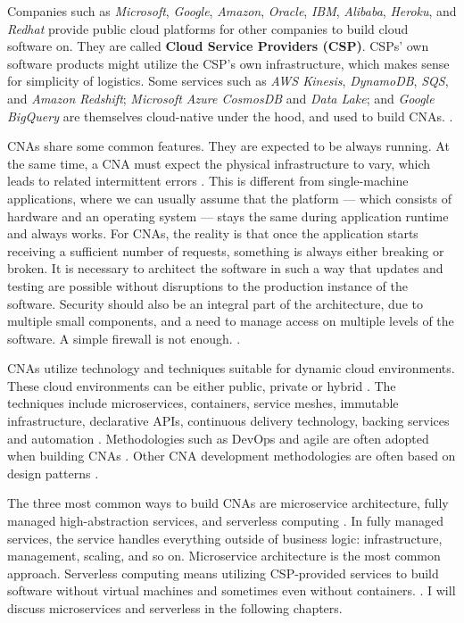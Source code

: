 \documentclass[utf8,english]{gradu3}
\begin{document}
Companies such as \textit{Microsoft}, \textit{Google}, \textit{Amazon}, 
\textit{Oracle}, \textit{IBM}, \textit{Alibaba}, \textit{Heroku}, and
\textit{Redhat} provide public cloud platforms for other companies to build cloud
software on. They are called \textbf{Cloud Service Providers (CSP)}. CSPs' own software
products might utilize the CSP's own infrastructure, which makes sense for
simplicity of logistics. Some services such as \textit{AWS Kinesis},
\textit{DynamoDB}, \textit{SQS}, and
\textit{Amazon Redshift}; \textit{Microsoft Azure CosmosDB} and \textit{Data Lake};
and \textit{Google BigQuery} are themselves cloud-native under the hood, and used to build CNAs.
\parencite[17]{Gannon2017}.

CNAs share some common features. They are expected to be always running. At the
same time, a CNA must expect the physical infrastructure to vary, which leads to
related intermittent errors \parencite[17]{Gannon2017}. This is different from
single-machine applications, where we can usually assume that the platform —
which consists of hardware and an operating system --- stays the same during
application runtime and always works. For CNAs, the reality is that once the
application starts receiving a sufficient number of requests, something is
always either breaking or broken. It is necessary to architect the software in
such a way that updates and testing are possible without disruptions to the
production instance of the software. Security should also be an integral part of
the architecture, due to multiple small components, and a need to manage access
on multiple levels of the software. A simple firewall is not enough.
\parencite[17]{Gannon2017}.

CNAs utilize technology and techniques suitable for dynamic cloud environments.
These cloud environments can be either public, private or hybrid
\parencite{CNAF2018}. The techniques include microservices, containers, service
meshes, immutable infrastructure, declarative APIs, continuous delivery
technology, backing services and automation \parencite{CNAF2018, Patrizio2018,
  Microsoft2022}. Methodologies such as DevOps and agile are often adopted when
building CNAs \parencite{Patrizio2018}. Other CNA development methodologies are
often based on design patterns \parencite{Kratzke2017}.

The three most common ways to build CNAs are microservice architecture, fully
managed high-abstraction services, and serverless computing
\parencite[17]{Gannon2017}. In fully managed services, the service handles
everything outside of business logic: infrastructure, management, scaling, and
so on. Microservice architecture is the most common approach. Serverless
computing means utilizing CSP-provided services to build software without
virtual machines and sometimes even without containers.
\parencite[17]{Gannon2017}. I will discuss microservices and serverless in the
following chapters.
\end{document}
